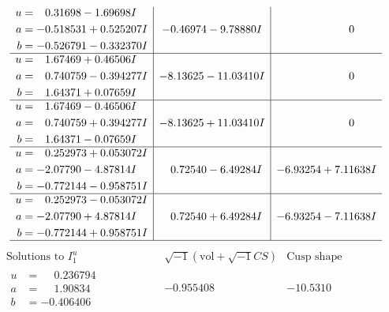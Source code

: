 \documentclass[1p]{elsarticle_modified}
\theoremstyle{definition}
\newcommand{\I}{\sqrt{-1}}
\begin{document}
$$\begin{array}{c|c|c}
\begin{aligned}
u &= \phantom{-}0.31698 - 1.69698 I \\
a &= -0.518531 + 0.525207 I \\
b &= -0.526791 - 0.332370 I\end{aligned}
 & -0.46974 - 9.78880 I & \phantom{-0.000000 } 0 \\ \hline\begin{aligned}
u &= \phantom{-}1.67469 + 0.46506 I \\
a &= \phantom{-}0.740759 - 0.394277 I \\
b &= \phantom{-}1.64371 + 0.07659 I\end{aligned}
 & -8.13625 - 11.03410 I & \phantom{-0.000000 } 0 \\ \hline\begin{aligned}
u &= \phantom{-}1.67469 - 0.46506 I \\
a &= \phantom{-}0.740759 + 0.394277 I \\
b &= \phantom{-}1.64371 - 0.07659 I\end{aligned}
 & -8.13625 + 11.03410 I & \phantom{-0.000000 } 0 \\ \hline\begin{aligned}
u &= \phantom{-}0.252973 + 0.053072 I \\
a &= -2.07790 - 4.87814 I \\
b &= -0.772144 - 0.958751 I\end{aligned}
 & \phantom{-}0.72540 - 6.49284 I & -6.93254 + 7.11638 I \\ \hline\begin{aligned}
u &= \phantom{-}0.252973 - 0.053072 I \\
a &= -2.07790 + 4.87814 I \\
b &= -0.772144 + 0.958751 I\end{aligned}
 & \phantom{-}0.72540 + 6.49284 I & -6.93254 - 7.11638 I\\
 \hline 
 \end{array}$$\newpage$$\begin{array}{c|c|c}  
\text{Solutions to }I^u_{1}& \I (\text{vol} + \sqrt{-1}CS) & \text{Cusp shape}\\
 \hline 
\begin{aligned}
u &= \phantom{-}0.236794\phantom{ +0.000000I} \\
a &= \phantom{-}1.90834\phantom{ +0.000000I} \\
b &= -0.406406\phantom{ +0.000000I}\end{aligned}
 & -0.955408\phantom{ +0.000000I} & -10.5310\phantom{ +0.000000I} \\ \hline\begin{aligned}

\end{aligned}
\end{array}$$
\end{document}
